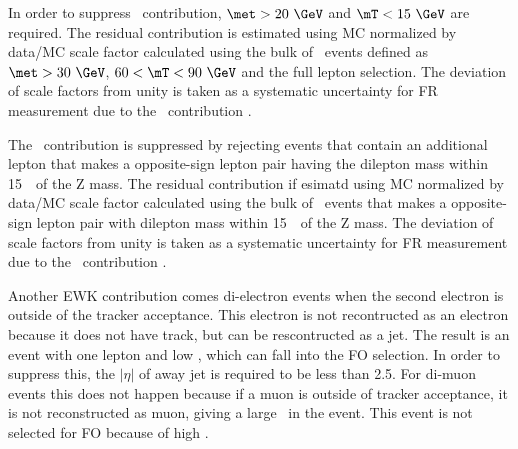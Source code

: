 In order to suppress 
\Wjets\ contribution, $\met>20~\GeV$ and $\mT<15~\GeV$ are required. 
The residual contribution is estimated using MC normalized by data/MC scale factor 
calculated using the bulk of \Wjets\ events defined as $\met>30~\GeV$, $60<\mT<90~\GeV$ 
and the full lepton selection. The deviation of scale factors from unity 
is taken as a systematic uncertainty for FR measurement due to the \Wjets\ contribution .

The \dyll\ contribution is suppressed by rejecting events 
that contain an additional lepton that makes a opposite-sign lepton pair 
having the dilepton mass within 15~\GeV\ of the Z mass.  
The residual contribution if esimatd using MC normalized by data/MC scale factor
calculated using the bulk of \dyll\ events that makes a opposite-sign lepton 
pair with dilepton mass within 15~\GeV\ of the Z mass.
The deviation of scale factors from unity
is taken as a systematic uncertainty for FR measurement due to the \dyll\ contribution .

Another EWK contribution comes di-electron events when the second electron 
is outside of the tracker acceptance. This electron is not recontructed 
as an electron because it does not have track, but can be rescontructed 
as a jet. The result is an event with one lepton and low \met, which 
can fall into the FO selection. In order to suppress this, the $\left| \eta \right|$ 
of away jet is required to be less than 2.5. For di-muon events 
this does not happen because if a muon is outside of tracker acceptance, 
it is not reconstructed as muon, giving a large \met\ in the event. 
This event is not selected for FO because of high \met. 

